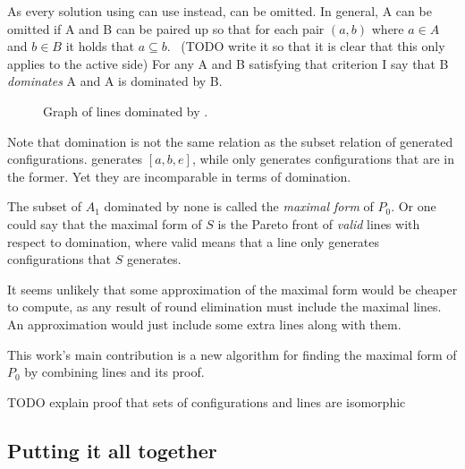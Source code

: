 \documentclass[english, 12pt, a4paper, sci, a-1b, online]{aaltothesis}
\begin{document}
As every solution using  can use  instead,  can be omitted. In general, A can be omitted if A and B can be paired up so that for each pair $(a, b)$ where $a \in A$ and $b \in B$ it holds that $a \subseteq b$.~\cite{DA2020} (TODO write it so that it is clear that this only applies to the active side) For any A and B satisfying that criterion I say that B \emph{dominates} A and A is dominated by B.

\begin{figure}[h]
  \centering
  \caption{Graph of lines dominated by .}
\end{figure}

Note that domination is not the same relation as the subset relation of generated configurations.  generates $[a, b, e]$, while  only generates configurations that are in the former. Yet they are incomparable in terms of domination.

The subset of $A_{1}$ dominated by none is called the \emph{maximal form} of $P_{0}$. Or one could say that the maximal form of $S$ is the Pareto front of \emph{valid} lines with respect to domination, where valid means that a line only generates configurations that $S$ generates.

It seems unlikely that some approximation of the maximal form would be cheaper to compute, as any result of round elimination must include the maximal lines. An approximation would just include some extra lines along with them.

This work's main contribution is a new algorithm for finding the maximal form of $P_{0}$ by combining lines and its proof.

TODO explain proof that sets of configurations and lines are isomorphic

\subsection{Putting it all together}
\end{document}
